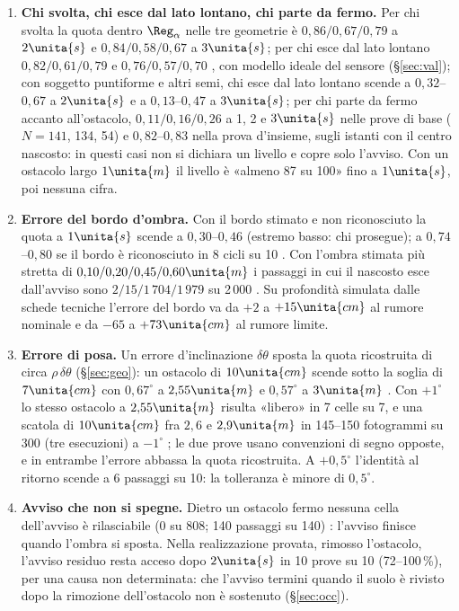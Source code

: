 \begin{enumerate}[label=\arabic*.,ref=\arabic*,leftmargin=1.8em]
\item \textbf{Chi svolta, chi esce dal lato lontano, chi parte da fermo.} Per chi svolta la quota dentro $\Reg_\alpha$ nelle tre geometrie è $0{,}86/0{,}67/0{,}79$ a $2\unita{s}$ e $0{,}84/0{,}58/0{,}67$ a $3\unita{s}$; per chi esce dal lato lontano $0{,}82/0{,}61/0{,}79$ e $0{,}76/0{,}57/0{,}70$ , con modello ideale del sensore (\S\ref{sec:val}); con soggetto puntiforme e altri semi, chi esce dal lato lontano scende a $0{,}32$--$0{,}67$ a $2\unita{s}$ e a $0{,}13$--$0{,}47$ a $3\unita{s}$; per chi parte da fermo accanto all'ostacolo, $0{,}11/0{,}16/0{,}26$ a 1, 2 e $3\unita{s}$ nelle prove di base ($N=141$, 134, 54) e $0{,}82$--$0{,}83$ nella prova d'insieme, sugli istanti con il centro nascosto: in questi casi non si dichiara un livello e copre solo l'avviso. Con un ostacolo largo $1\unita{m}$ il livello è «almeno 87 su 100» fino a $1\unita{s}$, poi nessuna cifra.
\item \textbf{Errore del bordo d'ombra.} Con il bordo stimato e non riconosciuto la quota a $1\unita{s}$ scende a $0{,}30$--$0{,}46$ (estremo basso: chi prosegue); a $0{,}74$--$0{,}80$ se il bordo è riconosciuto in 8 cicli su 10 . Con l'ombra stimata più stretta di $0{,}10/0{,}20/0{,}45/0{,}60\unita{m}$ i passaggi in cui il nascosto esce dall'avviso sono $2/15/1\,704/1\,979$ su 2\,000 . Su profondità simulata dalle schede tecniche l'errore del bordo va da $+2$ a $+15\unita{cm}$ al rumore nominale e da $-65$ a $+73\unita{cm}$ al rumore limite.
\item\label{lim:posa} \textbf{Errore di posa.} Un errore d'inclinazione $\delta\theta$ sposta la quota ricostruita di circa $\rho\,\delta\theta$ (\S\ref{sec:geo}): un ostacolo di $10\unita{cm}$ scende sotto la soglia di $7\unita{cm}$ con $0{,}67^\circ$ a $2{,}55\unita{m}$ e $0{,}57^\circ$ a $3\unita{m}$ . Con $+1^\circ$ lo stesso ostacolo a $2{,}55\unita{m}$ risulta «libero» in 7 celle su 7, e una scatola di $10\unita{cm}$ fra $2{,}6$ e $2{,}9\unita{m}$ in 145--150 fotogrammi su 300 (tre esecuzioni) a $-1^\circ$ ; le due prove usano convenzioni di segno opposte, e in entrambe l'errore abbassa la quota ricostruita. A $+0{,}5^\circ$ l'identità al ritorno scende a 6 passaggi su 10: la tolleranza è minore di $0{,}5^\circ$.
\item \textbf{Avviso che non si spegne.} Dietro un ostacolo fermo nessuna cella dell'avviso è rilasciabile (0 su 808; 140 passaggi su 140) : l'avviso finisce quando l'ombra si sposta. Nella realizzazione provata, rimosso l'ostacolo, l'avviso residuo resta acceso dopo $2\unita{s}$ in 10 prove su 10 (72--100\,\%), per una causa non determinata: che l'avviso termini quando il suolo è rivisto dopo la rimozione dell'ostacolo non è sostenuto  (\S\ref{sec:occ}).

\end{enumerate}
